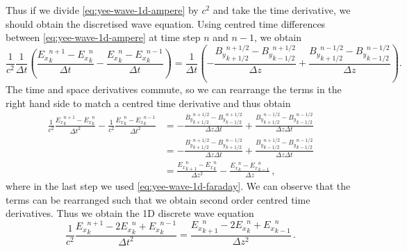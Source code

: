 \documentclass[12pt, class=report, crop=false]{standalone}
\begin{document}
Thus if we divide \cref{eq:yee-wave-1d-ampere} by \(c^2\) and take the time derivative,
we should obtain the discretised wave equation. Using centred time differences
between \cref{eq:yee-wave-1d-ampere} at time step \(n\) and \(n-1\), we obtain
\[
\frac{1}{c^2} \frac{1}{\Delta t} \left(\frac{{E_x}^{n+1}_k - {E_x}^n_k}{\Delta t}
- \frac{{E_x}^{n}_k - {E_x}^{n-1}_k}{\Delta t}\right) =
\frac{1}{\Delta t} \left(-\frac{{B_y}^{n+1/2}_{k+1/2} - {B_y}^{n+1/2}_{k-1/2}}{\Delta z}
+ \frac{{B_y}^{n-1/2}_{k+1/2} - {B_y}^{n-1/2}_{k-1/2}}{\Delta z}\right).
\]
The time and space derivatives commute, so we can rearrange the terms in the
right hand side to match a centred time derivative and thus obtain
\[
\begin{aligned}
  \frac{1}{c^2}\frac{{E_x}^{n+1}_k - {E_x}^n_k}{\Delta t^2}
- \frac{1}{c^2}\frac{{E_x}^{n}_k - {E_x}^{n-1}_k}{\Delta t^2} &=
- \frac{{B_y}^{n+1/2}_{k+1/2} - {B_y}^{n+1/2}_{k-1/2}}{\Delta z \Delta t}
+ \frac{{B_y}^{n-1/2}_{k+1/2} - {B_y}^{n-1/2}_{k-1/2}}{\Delta z \Delta t} \\&=
- \frac{{B_y}^{n+1/2}_{k+1/2} - {B_y}^{n-1/2}_{k+1/2}}{\Delta z \Delta t}
+ \frac{{B_y}^{n+1/2}_{k-1/2} - {B_y}^{n-1/2}_{k-1/2}}{\Delta z \Delta t} \\&=
  \frac{{E_x}^n_{k+1} - {E_x}^n_k}{\Delta z^2} - \frac{{E_x}^n_{k} - {E_x}^n_{k-1}}{\Delta z}\,,
\end{aligned}
\]
where in the last step we used \cref{eq:yee-wave-1d-faraday}. We can observe
that the terms can be rearranged such that we obtain second order centred time
derivatives. Thus we obtain the 1D discrete wave equation
\begin{equation}
\label{eq:discrete-wave-1d}
\frac{1}{c^2} \frac{{E_x}^{n+1}_k - 2{E_x}^n_k + {E_x}^{n-1}_k}{\Delta t^2} =
\frac{{E_x}^n_{k+1} - 2{E_x}^n_k + {E_x}^n_{k-1}}{\Delta z^2}\,.
\end{equation}
\end{document}
